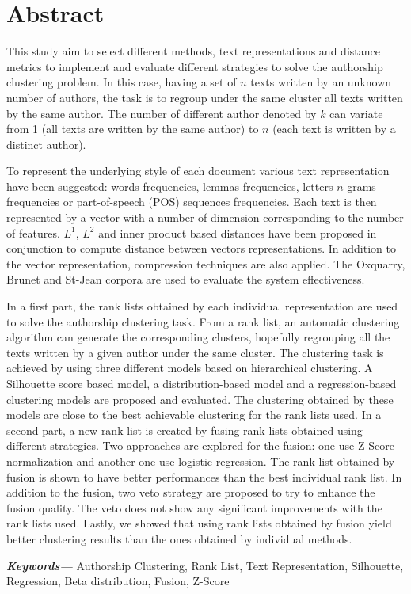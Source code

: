 \chapter*{Abstract}
This study aim to select different methods, text representations and distance metrics to implement and evaluate different strategies to solve the authorship clustering problem.
In this case, having a set of $n$ texts written by an unknown number of authors, the task is to regroup under the same cluster all texts written by the same author.
The number of different author denoted by $k$ can variate from 1 (all texts are written by the same author) to $n$ (each text is written by a distinct author).

To represent the underlying style of each document various text representation have been suggested: words frequencies, lemmas frequencies, letters $n$-grams frequencies or part-of-speech (POS) sequences frequencies.
Each text is then represented by a vector with a number of dimension corresponding to the number of features.
$L^1$, $L^2$ and inner product based distances have been proposed in conjunction to compute distance between vectors representations.
In addition to the vector representation, compression techniques are also applied.
The Oxquarry, Brunet and St-Jean corpora are used to evaluate the system effectiveness.

In a first part, the rank lists obtained by each individual representation are used to solve the authorship clustering task.
From a rank list, an automatic clustering algorithm can generate the corresponding clusters, hopefully regrouping all the texts written by a given author under the same cluster.
The clustering task is achieved by using three different models based on hierarchical clustering.
A Silhouette score based model, a distribution-based model and a regression-based clustering models are proposed and evaluated.
The clustering obtained by these models are close to the best achievable clustering for the rank lists used.
In a second part, a new rank list is created by fusing rank lists obtained using different strategies.
Two approaches are explored for the fusion: one use Z-Score normalization and another one use logistic regression.
The rank list obtained by fusion is shown to have better performances than the best individual rank list.
In addition to the fusion, two veto strategy are proposed to try to enhance the fusion quality.
The veto does not show any significant improvements with the rank lists used.
Lastly, we showed that using rank lists obtained by fusion yield better clustering results than the ones obtained by individual methods.

{\small \textbf{\textit{Keywords---}} Authorship Clustering, Rank List, Text Representation, Silhouette, Regression, Beta distribution, Fusion, Z-Score}
